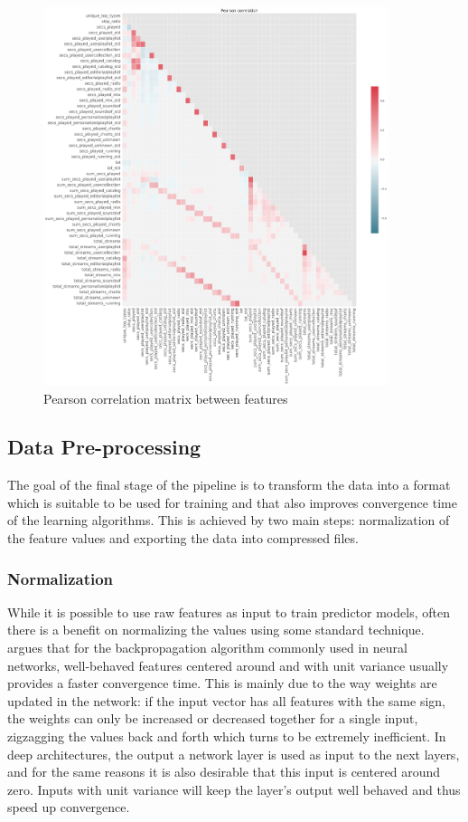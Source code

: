 \documentclass{kththesis}
\begin{document}
	\begin{figure}[h]
    \centering
    \includegraphics[width=0.9\textwidth,height=0.9\textheight,keepaspectratio]{figures/corr.pdf}
    \caption{Pearson correlation matrix between features}
    \label{fig:correlation}
\end{figure}

\subsection{Data Pre-processing}

The goal of the final stage of the pipeline is to transform the data into a format which is suitable to be used for training and that also improves convergence time of the learning algorithms. This is achieved by two main steps: normalization of the feature values and exporting the data into compressed files.

\subsubsection{Normalization}

While it is possible to use raw features as input to train predictor models, often there is a benefit on normalizing the values using some standard technique. \citep{lecun2012efficient} argues that for the backpropagation algorithm commonly used in neural networks, well-behaved features centered around and with unit variance usually provides a faster convergence time. This is mainly due to the way weights are updated in the network: if the input vector has all features with the same sign, the weights can only be increased or decreased together for a single input, zigzagging the values back and forth which turns to be extremely inefficient. In deep architectures, the output a network layer is used as input to the next layers, and for the same reasons it is also desirable that this input is centered around zero. Inputs with unit variance will keep the layer's output well behaved and thus speed up convergence.
\end{document}
